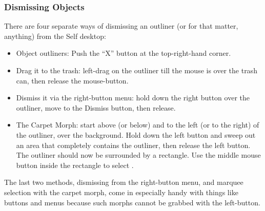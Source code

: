 \documentclass[letterpaper,10pt,english]{sphinxmanual}
\begin{document}
\subsubsection{Dismissing Objects}
\label{howtoprg:dismissing-objects}
There are four separate ways of dismissing an outliner (or for that matter, anything) from the Self
desktop:
\begin{itemize}
\item {} 
Object outliners: Push the “X” button at the top-right-hand corner.

\item {} 
Drag it to the trash: left-drag on the outliner till the mouse is over the trash can,  then release the mouse-button.

\item {} 
Dismiss it via the right-button menu: hold down the right button over the outliner, move to the Dismiss button, then release.

\item {} 
The Carpet Morph: start above (or below) and to the left (or to the right) of the outliner, over the background. Hold down the left button and sweep out an area that completely contains the outliner, then release the left button. The outliner should now be surrounded by a rectangle. Use the middle mouse button inside the rectangle to select .

\end{itemize}

The last two methods, dismissing from the right-button menu, and marquee selection with the carpet
morph, come in especially handy with things like buttons and menus because such morphs cannot
be grabbed with the left-button.
\end{document}
